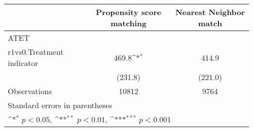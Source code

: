 {
\def\sym#1{\ifmmode^{#1}\else\(^{#1}\)\fi}
\begin{tabular}{l*{2}{c}}
\hline\hline
                    &\multicolumn{1}{c}{Propensity score matching}&\multicolumn{1}{c}{Nearest Neighbor match}\\
\hline
ATET                &                     &                     \\
r1vs0.Treatment indicator&       469.8\sym{*}  &       414.9         \\
                    &     (231.8)         &     (221.0)         \\
\hline
Observations        &       10812         &        9764         \\
\hline\hline
\multicolumn{3}{l}{\footnotesize Standard errors in parentheses}\\
\multicolumn{3}{l}{\footnotesize \sym{*} \(p<0.05\), \sym{**} \(p<0.01\), \sym{***} \(p<0.001\)}\\
\end{tabular}
}
